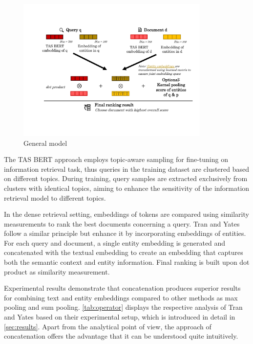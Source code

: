 \begin{figure}[!htb]
    \centering
    \includegraphics[trim={1.5cm 3.3cm 1.5cm 3.2cm}, clip, width=0.85\textwidth]{resources/general_model} 
    \caption{General model}
    \label{fig:general_model}
\end{figure}

The TAS BERT approach employs topic-aware sampling for fine-tuning on information retrieval task, thus queries in the training dataset are clustered based on different topics. During training, query samples are extracted exclusively from clusters with identical topics, aiming to enhance the sensitivity of the information retrieval model to different topics.

In the dense retrieval setting, embeddings of tokens are compared using similarity measurements to rank the best documents concerning a query. Tran and Yates follow a similar principle but enhance it by incorporating embeddings of entities. For each query and document, a single entity embedding is generated and concatenated with the textual embedding to create an embedding that captures both the semantic context and entity information. Final ranking is built upon dot product as similarity measurement.

Experimental results demonstrate that concatenation produces superior results for combining text and entity embeddings compared to other methods as max pooling and sum pooling. \autoref{tab:operator} displays the respective analysis of Tran and Yates based on their experimental setup, which is introduced in detail in \autoref{sec:results}. Apart from the analytical point of view, the approach of concatenation offers the advantage that it can be understood quite intuitively.


